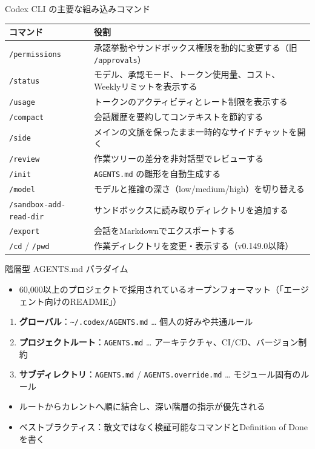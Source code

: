 \documentclass[aspectratio=169,11pt]{beamer}
\newcommand{\cmd}[1]{\texttt{#1}}
\newcommand{\home}{\textasciitilde}
\begin{document}
\begin{frame}{Codex CLI の主要な組み込みコマンド}
  \scriptsize
  \begin{tabularx}{\textwidth}{P{38mm}L}
    \toprule
    コマンド & 役割 \\
    \midrule
    \cmd{/permissions} & 承認挙動やサンドボックス権限を動的に変更する（旧 \cmd{/approvals}） \\
    \cmd{/status} & モデル、承認モード、トークン使用量、コスト、Weeklyリミットを表示する \\
    \cmd{/usage} & トークンのアクティビティとレート制限を表示する \\
    \cmd{/compact} & 会話履歴を要約してコンテキストを節約する \\
    \cmd{/side} & メインの文脈を保ったまま一時的なサイドチャットを開く \\
    \cmd{/review} & 作業ツリーの差分を非対話型でレビューする \\
    \cmd{/init} & \cmd{AGENTS.md} の雛形を自動生成する \\
    \cmd{/model} & モデルと推論の深さ（low/medium/high）を切り替える \\
    \cmd{/sandbox-add-read-dir} & サンドボックスに読み取りディレクトリを追加する \\
    \cmd{/export} & 会話をMarkdownでエクスポートする \\
    \cmd{/cd} / \cmd{/pwd} & 作業ディレクトリを変更・表示する（v0.149.0以降） \\
    \bottomrule
  \end{tabularx}
  \par\hfill{\scriptsize\cite{r36,r37,r39,r41}}
\end{frame}

\begin{frame}{階層型 AGENTS.md パラダイム}
  \begin{itemize}
    \item 60,000以上のプロジェクトで採用されているオープンフォーマット（「エージェント向けのREADME」）\cite{r43}
  \end{itemize}
  \begin{enumerate}
    \item \textbf{グローバル}：\cmd{\home/.codex/AGENTS.md} … 個人の好みや共通ルール
    \item \textbf{プロジェクトルート}：\cmd{AGENTS.md} … アーキテクチャ、CI/CD、バージョン制約
    \item \textbf{サブディレクトリ}：\cmd{AGENTS.md} / \cmd{AGENTS.override.md} … モジュール固有のルール
  \end{enumerate}
  \begin{itemize}
    \item ルートからカレントへ順に結合し、\alert{深い階層の指示が優先}される\cite{r46}
    \item ベストプラクティス：散文ではなく検証可能なコマンドとDefinition of Doneを書く\cite{r43}
  \end{itemize}
\end{frame}
\end{document}
